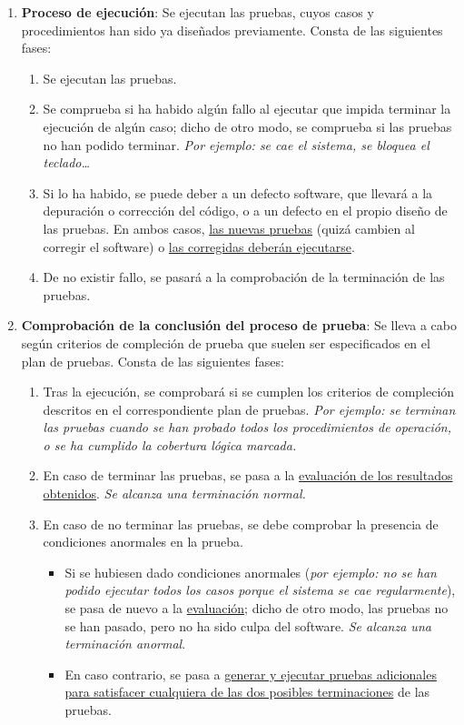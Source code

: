 \begin{enumerate}
    \item \textbf{Proceso de ejecución}: Se ejecutan las pruebas, cuyos casos y procedimientos han sido ya diseñados previamente. Consta de las siguientes fases:
    \begin{enumerate}
        \item Se ejecutan las pruebas.
        \item Se comprueba si ha habido algún fallo al ejecutar que impida terminar la ejecución de algún caso; dicho de otro modo, se comprueba si las pruebas no han podido terminar. \textit{Por ejemplo: se cae el sistema, se bloquea el teclado\ldots}
        \item Si lo ha habido, se puede deber a un defecto software, que llevará a la depuración o corrección del código, o a un defecto en el propio diseño de las pruebas. En ambos casos, \uline{las nuevas pruebas} (quizá cambien al corregir el software) o \uline{las corregidas deberán ejecutarse}.
        \item De no existir fallo, se pasará a la comprobación de la terminación de las pruebas.
    \end{enumerate}

    \item \textbf{Comprobación de la conclusión del proceso de prueba}: Se lleva a cabo según criterios de compleción de prueba que suelen ser especificados en el plan de pruebas. Consta de las siguientes fases:
    \begin{enumerate}
        \item Tras la ejecución, se comprobará si se cumplen los criterios de compleción descritos en el correspondiente plan de pruebas. \textit{Por ejemplo: se terminan las pruebas cuando se han probado todos los procedimientos de operación, o se ha cumplido la cobertura lógica marcada.}
        \item En caso de terminar las pruebas, se pasa a la \uline{evaluación de los resultados obtenidos}. \textit{Se alcanza una terminación normal.}
        \item En caso de no terminar las pruebas, se debe comprobar la presencia de condiciones anormales en la prueba.
        \begin{itemize}
            \item Si se hubiesen dado condiciones anormales (\textit{por ejemplo: no se han podido ejecutar todos los casos porque el sistema se cae regularmente}), se pasa de nuevo a la \uline{evaluación}; dicho de otro modo, las pruebas no se han pasado, pero no ha sido culpa del software. \textit{Se alcanza una terminación anormal}.
            \item En caso contrario, se pasa a \uline{generar y ejecutar pruebas adicionales para satisfacer cualquiera de las dos posibles terminaciones} de las pruebas.
        \end{itemize}
    \end{enumerate}
\end{enumerate}

